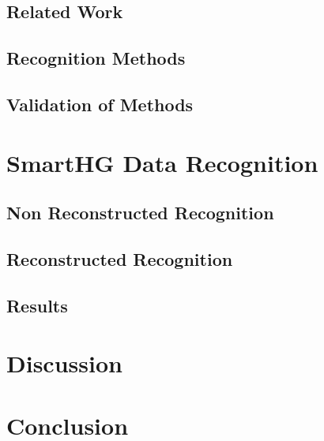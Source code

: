 \section{Related Work} 
\section{Recognition Methods} 
\section{Validation of Methods} 

\chapter{SmartHG Data Recognition} 
\section{Non Reconstructed Recognition }
\section{Reconstructed Recognition }
\section{Results}

\chapter{Discussion}

\chapter{Conclusion}
\begingroup
	\raggedright
	
\endgroup



